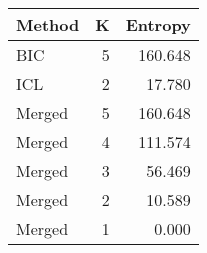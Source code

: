 \begin{center} 
\begin{tabular}{lrr}
 Method & K & Entropy \\ 
  \hline
\hline
BIC &    5 & 160.648 \\ 
  ICL &    2 & 17.780 \\ 
  Merged &    5 & 160.648 \\ 
  Merged &    4 & 111.574 \\ 
  Merged &    3 & 56.469 \\ 
  Merged &    2 & 10.589 \\ 
  Merged &    1 & 0.000 \\ 
  \end{tabular}
\end{center} 
